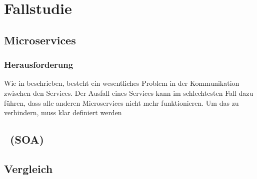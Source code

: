 \chapter{Fallstudie}
\label{chap:fallstudie}

\section{Microservices}
\subsection{Herausforderung}
Wie in \cite[S. 25]{EWolff2016} beschrieben, besteht ein wesentliches Problem in der Kommunikation zwischen den Services. Der Ausfall eines Services kann im schlechtesten Fall dazu führen, dass alle anderen Microservices nicht mehr funktionieren. Um das zu verhindern, muss klar definiert werden

\section{\SOA\ (SOA)}

\section{Vergleich}

